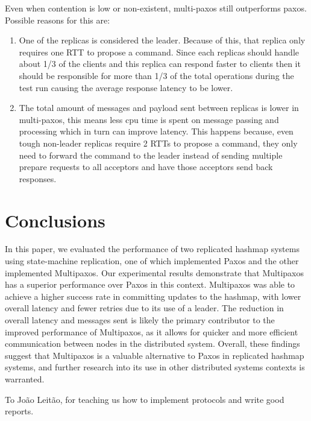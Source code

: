 \documentclass[sigconf]{acmart}
\begin{document}
Even when contention is low or non-existent, multi-paxos still outperforms paxos.
Possible reasons for this are:
\begin{enumerate}
    \item One of the replicas is considered the leader.
        Because of this, that replica only requires one RTT to propose a command.
        Since each replicas should handle about 1/3 of the clients and this replica can respond faster to clients
        then it should be responsible for more than 1/3 of the total operations during the test run causing the average response latency to be lower.
    \item The total amount of messages and payload sent between replicas is lower in multi-paxos, this means less cpu time is spent on message passing and processing which in turn can improve latency.
        This happens because, even tough non-leader replicas require 2 RTTs to propose a command, they only need to forward the command to the leader instead of sending multiple prepare requests to all acceptors and have those acceptors send back responses.
\end{enumerate}

\section{Conclusions}

In this paper, we evaluated the performance of two replicated hashmap systems using state-machine replication, one of which implemented Paxos and the other implemented Multipaxos.
Our experimental results demonstrate that Multipaxos has a superior performance over Paxos in this context.
Multipaxos was able to achieve a higher success rate in committing updates to the hashmap, with lower overall latency and fewer retries due to its use of a leader.
The reduction in overall latency and messages sent is likely the primary contributor to the improved performance of Multipaxos, as it allows for quicker and more efficient communication between nodes in the distributed system.
Overall, these findings suggest that Multipaxos is a valuable alternative to Paxos in replicated hashmap systems, and further research into its use in other distributed systems contexts is warranted.

\begin{acks}
    To João Leitão, for teaching us how to implement protocols and write good reports.
\end{acks}



\end{document}
